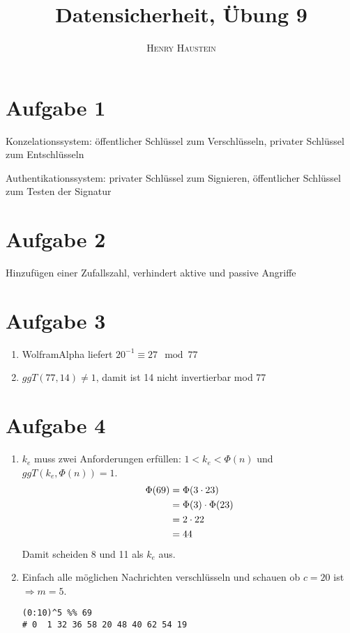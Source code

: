 \documentclass{article}
\title{\textbf{Datensicherheit, Übung 9}}
\author{\textsc{Henry Haustein}}
\date{}
\begin{document}
	\maketitle
	
	\section*{Aufgabe 1}
	Konzelationssystem: öffentlicher Schlüssel zum Verschlüsseln, privater Schlüssel zum Entschlüsseln
	
	Authentikationssystem: privater Schlüssel zum Signieren, öffentlicher Schlüssel zum Testen der Signatur

	\section*{Aufgabe 2}
	Hinzufügen einer Zufallszahl, verhindert aktive und passive Angriffe
	
	\section*{Aufgabe 3}
	\begin{enumerate}[label=(\alph*)]
		\item WolframAlpha liefert $20^{-1} \equiv 27\mod 77$
		\item $ggT(77,14)\neq 1$, damit ist 14 nicht invertierbar mod 77
	\end{enumerate}
	
	\section*{Aufgabe 4}
	\begin{enumerate}[label=(\alph*)]
		\item $k_e$ muss zwei Anforderungen erfüllen: $1<k_e<\Phi(n)$ und $ggT(k_e,\Phi(n))=1$.
		\begin{align}
			\Phi(69) &= \Phi(3\cdot 23) \notag \\
			&= \Phi(3)\cdot \Phi(23) \notag \\
			&= 2\cdot 22 \notag \\
			&= 44 \notag
		\end{align}
		Damit scheiden 8 und 11 als $k_e$ aus.
		\item Einfach alle möglichen Nachrichten verschlüsseln und schauen ob $c=20$ ist $\Rightarrow m = 5$.
		\begin{lstlisting}
(0:10)^5 %% 69
# 0  1 32 36 58 20 48 40 62 54 19
		\end{lstlisting}
	\end{enumerate}
	
\end{document}
